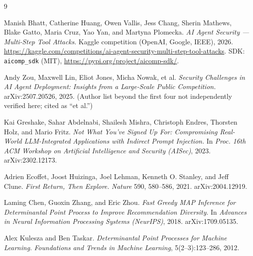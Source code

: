 \documentclass[11pt]{article}
\newcommand{\code}[1]{\texttt{#1}}
\begin{document}
\begin{thebibliography}{9}
\small

Manish Bhatt, Catherine Huang, Owen Vallis, Jess Chang, Sherin Mathews, Blake Gatto,
Maria Cruz, Yao Yan, and Martyna Plomecka.
\emph{AI Agent Security --- Multi-Step Tool Attacks.} Kaggle competition (OpenAI,
Google, IEEE), 2026.
\url{https://kaggle.com/competitions/ai-agent-security-multi-step-tool-attacks}.
SDK: \code{aicomp\_sdk} (MIT), \url{https://pypi.org/project/aicomp-sdk/}.

Andy Zou, Maxwell Lin, Eliot Jones, Micha Nowak, et al.
\emph{Security Challenges in AI Agent Deployment: Insights from a Large-Scale Public
Competition.} arXiv:2507.20526, 2025.
(Author list beyond the first four not independently verified here; cited as ``et al.'')

Kai Greshake, Sahar Abdelnabi, Shailesh Mishra, Christoph Endres, Thorsten Holz, and
Mario Fritz.
\emph{Not What You've Signed Up For: Compromising Real-World LLM-Integrated Applications
with Indirect Prompt Injection.} In \emph{Proc. 16th ACM Workshop on Artificial
Intelligence and Security (AISec)}, 2023. arXiv:2302.12173.

Adrien Ecoffet, Joost Huizinga, Joel Lehman, Kenneth O. Stanley, and Jeff Clune.
\emph{First Return, Then Explore.} \emph{Nature} 590, 580--586, 2021. arXiv:2004.12919.

Laming Chen, Guoxin Zhang, and Eric Zhou.
\emph{Fast Greedy MAP Inference for Determinantal Point Process to Improve Recommendation
Diversity.} In \emph{Advances in Neural Information Processing Systems (NeurIPS)}, 2018.
arXiv:1709.05135.

Alex Kulesza and Ben Taskar.
\emph{Determinantal Point Processes for Machine Learning.} \emph{Foundations and Trends
in Machine Learning}, 5(2--3):123--286, 2012.

\end{thebibliography}
\end{document}
